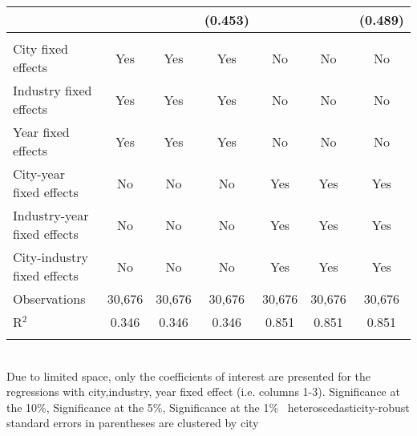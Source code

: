 \documentclass[12pt]{article}
\begin{document}
\begin{table}[!htbp]
\begin{adjustbox}{width=\textwidth, totalheight=\baselineskip,keepaspectratio}
\begin{tabular}{@{\extracolsep{5pt}}lcccccc}
  &  &  & (0.453) &  &  & (0.489) \\ 
 \hline \\[-1.8ex] 
City fixed effects & Yes & Yes & Yes & No & No & No \\ 
Industry fixed effects & Yes & Yes & Yes & No & No & No \\ 
Year fixed effects & Yes & Yes & Yes & No & No & No \\ 
City-year fixed effects & No & No & No & Yes & Yes & Yes \\ 
Industry-year fixed effects & No & No & No & Yes & Yes & Yes \\ 
City-industry fixed effects & No & No & No & Yes & Yes & Yes \\ 
Observations & 30,676 & 30,676 & 30,676 & 30,676 & 30,676 & 30,676 \\ 
R$^{2}$ & 0.346 & 0.346 & 0.346 & 0.851 & 0.851 & 0.851 \\ 
\hline 
\hline \\[-1.8ex] 
\end{tabular}
\end{adjustbox}
\begin{tablenotes} 
 \small 
 \item \\ 
\footnotesize{
Due to limited space, only the coefficients of interest are presented 
for the regressions with city,industry, year fixed effect (i.e. columns 1-3).
\sym{*} Significance at the 10\%, \sym{**} Significance at the 5\%, \sym{***} Significance at the 1\% \
heteroscedasticity-robust standard errors in parentheses are clustered by city 
}
 
\end{tablenotes}
\end{table}
\end{document}

